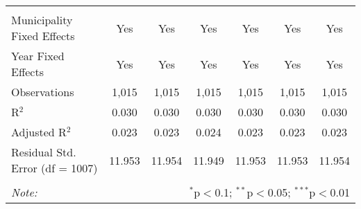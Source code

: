\begin{table}[!htbp]
\begin{tabular}{@{\extracolsep{5pt}}lcccccc}
  & & & & & & \\ 
\hline \\[-1.8ex] 
Municipality Fixed Effects & Yes & Yes & Yes & Yes & Yes & Yes \\ 
Year Fixed Effects & Yes & Yes & Yes & Yes & Yes & Yes \\ 
Observations & 1,015 & 1,015 & 1,015 & 1,015 & 1,015 & 1,015 \\ 
R$^{2}$ & 0.030 & 0.030 & 0.030 & 0.030 & 0.030 & 0.030 \\ 
Adjusted R$^{2}$ & 0.023 & 0.023 & 0.024 & 0.023 & 0.023 & 0.023 \\ 
Residual Std. Error (df = 1007) & 11.953 & 11.954 & 11.949 & 11.953 & 11.953 & 11.954 \\ 
\hline 
\hline \\[-1.8ex] 
\textit{Note:}  & \multicolumn{6}{r}{$^{*}$p$<$0.1; $^{**}$p$<$0.05; $^{***}$p$<$0.01} \\ 
\end{tabular} 
\end{table} 
